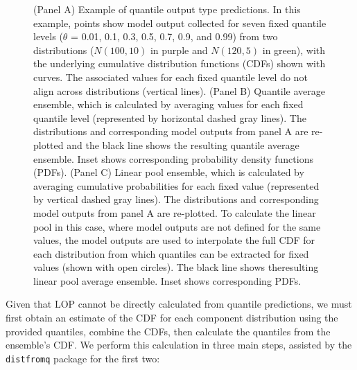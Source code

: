 \documentclass[
  article,
  shortnames,
  notitle]{jss}
\begin{document}
\begin{figure}


\caption{\label{fig-example-quantile-average-and-linear-pool}(Panel A)
Example of quantile output type predictions. In this example, points
show model output collected for seven fixed quantile levels (\(\theta\)
= 0.01, 0.1, 0.3, 0.5, 0.7, 0.9, and 0.99) from two distributions
(\(N(100, 10)\) in purple and \(N(120, 5)\) in green), with the
underlying cumulative distribution functions (CDFs) shown with curves.
The associated values for each fixed quantile level do not align across
distributions (vertical lines). (Panel B) Quantile average ensemble,
which is calculated by averaging values for each fixed quantile level
(represented by horizontal dashed gray lines). The distributions and
corresponding model outputs from panel A are re-plotted and the black
line shows the resulting quantile average ensemble. Inset shows
corresponding probability density functions (PDFs). (Panel C) Linear
pool ensemble, which is calculated by averaging cumulative probabilities
for each fixed value (represented by vertical dashed gray lines). The
distributions and corresponding model outputs from panel A are
re-plotted. To calculate the linear pool in this case, where model
outputs are not defined for the same values, the model outputs are used
to interpolate the full CDF for each distribution from which quantiles
can be extracted for fixed values (shown with open circles). The black
line shows theresulting linear pool average ensemble. Inset shows
corresponding PDFs.}

\end{figure}%

Given that LOP cannot be directly calculated from quantile predictions,
we must first obtain an estimate of the CDF for each component
distribution using the provided quantiles, combine the CDFs, then
calculate the quantiles from the ensemble's CDF. We perform this
calculation in three main steps, assisted by the \texttt{distfromq}
package \citep{distfromq} for the first two:
\end{document}
